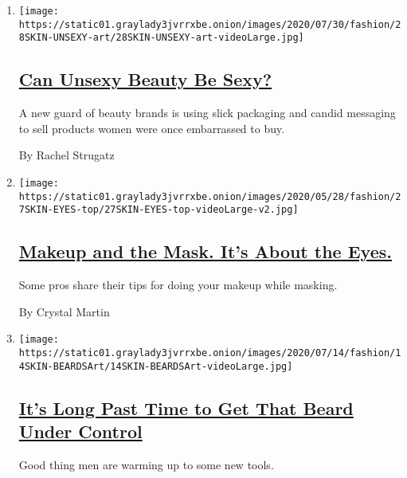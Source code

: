 \begin{enumerate}
\def\labelenumi{\arabic{enumi}.}
\item
  \texttt{[image: https://static01.graylady3jvrrxbe.onion/images/2020/07/30/fashion/28SKIN-UNSEXY-art/28SKIN-UNSEXY-art-videoLarge.jpg]}

  \hypertarget{can-unsexy-beauty-be-sexy-1}{%
  \subsection{\texorpdfstring{\href{/2020/07/28/style/can-unsexy-beauty-be-sexy.html}{Can
  Unsexy Beauty Be
  Sexy?}}{Can Unsexy Beauty Be Sexy?}}\label{can-unsexy-beauty-be-sexy-1}}

  A new guard of beauty brands is using slick packaging and candid
  messaging to sell products women were once embarrassed to buy.

  By Rachel Strugatz
\item
  \texttt{[image: https://static01.graylady3jvrrxbe.onion/images/2020/05/28/fashion/27SKIN-EYES-top/27SKIN-EYES-top-videoLarge-v2.jpg]}

  \hypertarget{makeup-and-the-mask-its-about-the-eyes}{%
  \subsection{\texorpdfstring{\href{/2020/05/26/style/makeup-and-the-mask-its-about-the-eyes.html}{Makeup
  and the Mask. It's About the
  Eyes.}}{Makeup and the Mask. It's About the Eyes.}}\label{makeup-and-the-mask-its-about-the-eyes}}

  Some pros share their tips for doing your makeup while masking.

  By Crystal Martin
\item
  \texttt{[image: https://static01.graylady3jvrrxbe.onion/images/2020/07/14/fashion/14SKIN-BEARDSArt/14SKIN-BEARDSArt-videoLarge.jpg]}

  \hypertarget{its-long-past-time-to-get-that-beard-under-control}{%
  \subsection{\texorpdfstring{\href{/2020/07/15/style/its-long-past-time-to-get-that-beard-under-control.html}{It's
  Long Past Time to Get That Beard Under
  Control}}{It's Long Past Time to Get That Beard Under Control}}\label{its-long-past-time-to-get-that-beard-under-control}}

  Good thing men are warming up to some new tools.


\end{enumerate}

